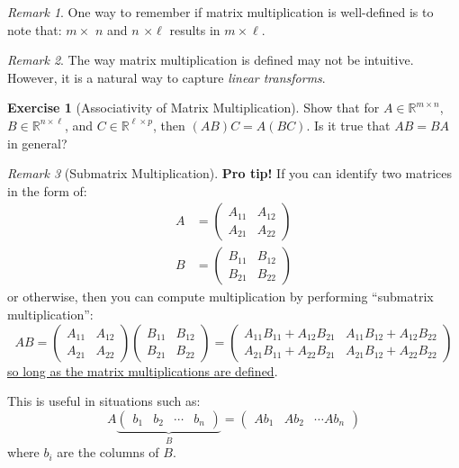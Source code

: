 \documentclass[12pt, a4paper]{article}
\newcommand{\R}{\mathbb{R}}
\theoremstyle{remark}
\newtheorem{remark}{Remark}
\theoremstyle{definition}
\newtheorem{exercise}{Exercise}
\numberwithin{equation}{section}
\numberwithin{definition}{section}
\numberwithin{example}{section}
\numberwithin{exercise}{section}
\numberwithin{remark}{section}
\numberwithin{figure}{section}
\begin{document}
\begin{remark}
    One way to remember if matrix multiplication is well-defined is to note that:
    $m \times$ \underline{$n$} and \underline{$n$} $\times \ell$ results in $m \times \ell$.
\end{remark}
\begin{remark}
    The way matrix multiplication is defined may not be intuitive.
    However, it is a natural way to capture \textit{linear transforms}.
\end{remark}
\begin{exercise}[Associativity of Matrix Multiplication]
    Show that for $A \in \R^{m \times n}$, $B \in \R^{n \times \ell}$, and $C \in \R^{\ell \times p}$, then $(AB)C = A(BC)$. Is it true that $AB=BA$ in general?
\end{exercise}
\begin{remark}[Submatrix Multiplication]
    \textbf{Pro tip!}
    If you can identify two matrices in the form of:
    \begin{align*}
        A &= 
        \begin{pmatrix}
            A_{11} & A_{12} \\ A_{21} & A_{22}
        \end{pmatrix} \\
        B &= 
        \begin{pmatrix}
            B_{11} & B_{12} \\ B_{21} & B_{22}
        \end{pmatrix}
    \end{align*}
    or otherwise, then you can compute multiplication by performing ``submatrix multiplication'':
    \begin{equation*}
        AB = 
        \begin{pmatrix}
            A_{11} & A_{12} \\ A_{21} & A_{22}
        \end{pmatrix} 
        \begin{pmatrix}
            B_{11} & B_{12} \\ B_{21} & B_{22}
        \end{pmatrix}
        =
        \begin{pmatrix}
            A_{11}B_{11} + A_{12}B_{21} & A_{11} B_{12} + A_{12} B_{22} \\
            A_{21}B_{11} + A_{22}B_{21} & A_{21} B_{12} + A_{22} B_{22}
        \end{pmatrix}
    \end{equation*}
    \underline{so long as the matrix multiplications are defined}.

    This is useful in situations such as:
    \begin{equation*}
        A
        \underbrace{
        \begin{pmatrix}
            b_1 & b_2 & \cdots & b_n
    \end{pmatrix}}
    _{B}
    =
    \begin{pmatrix}
        Ab_1 & Ab_2 & \cdots Ab_n
    \end{pmatrix}
    \end{equation*}
    where $b_i$ are the columns of $B$.
\end{remark}
\end{document}
